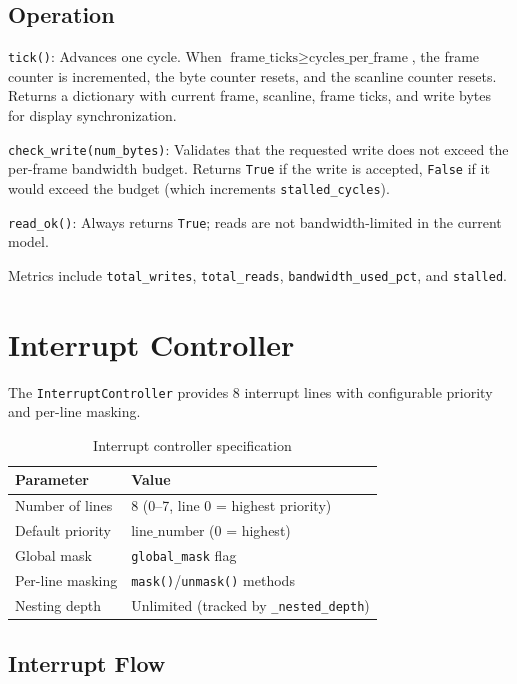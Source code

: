 \documentclass[10pt,a4paper,twoside]{book}
\begin{document}
\subsection{Operation}

\noindent\texttt{tick()}: Advances one cycle. When
$\text{frame\_ticks} \ge \text{cycles\_per\_frame}$, the frame counter is
incremented, the byte counter resets, and the scanline counter resets.
Returns a dictionary with current frame, scanline, frame ticks, and write
bytes for display synchronization.

\noindent\texttt{check\_write(num\_bytes)}: Validates that the requested
write does not exceed the per-frame bandwidth budget. Returns \texttt{True}
if the write is accepted, \texttt{False} if it would exceed the budget
(which increments \texttt{stalled\_cycles}).

\noindent\texttt{read\_ok()}: Always returns \texttt{True}; reads are not
bandwidth-limited in the current model.

Metrics include \texttt{total\_writes}, \texttt{total\_reads},
\texttt{bandwidth\_used\_pct}, and \texttt{stalled}.

\section{Interrupt Controller}

The \texttt{InterruptController} provides 8 interrupt lines with
configurable priority and per-line masking.

\begin{table}[H]
\centering
\caption{Interrupt controller specification}
\label{tab:intcparams}
\begin{tabular}{ll}
\toprule
Parameter & Value \\
\midrule
Number of lines & 8 (0--7, line 0 = highest priority) \\
Default priority & $\text{line\_number}$ (0 = highest) \\
Global mask & \texttt{global\_mask} flag \\
Per-line masking & \texttt{mask()}/\texttt{unmask()} methods \\
Nesting depth & Unlimited (tracked by \texttt{\_nested\_depth}) \\
\bottomrule
\end{tabular}
\end{table}

\subsection{Interrupt Flow}
\end{document}
